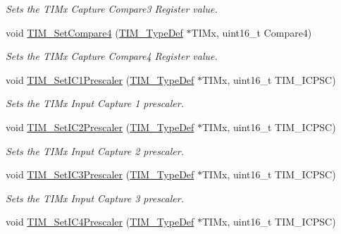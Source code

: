 \begin{DoxyCompactItemize}
\begin{DoxyCompactList}\small\item\em Sets the T\+I\+Mx Capture Compare3 Register value. \end{DoxyCompactList}\item 
void \mbox{\hyperlink{group___t_i_m___private___functions_gaf428edf474804691d6f587e78c97a082}{T\+I\+M\+\_\+\+Set\+Compare4}} (\mbox{\hyperlink{struct_t_i_m___type_def}{T\+I\+M\+\_\+\+Type\+Def}} $\ast$T\+I\+Mx, uint16\+\_\+t Compare4)
\begin{DoxyCompactList}\small\item\em Sets the T\+I\+Mx Capture Compare4 Register value. \end{DoxyCompactList}\item 
void \mbox{\hyperlink{group___t_i_m___private___functions_gaf0f684dea88e222de9689d8ed0ca8805}{T\+I\+M\+\_\+\+Set\+I\+C1\+Prescaler}} (\mbox{\hyperlink{struct_t_i_m___type_def}{T\+I\+M\+\_\+\+Type\+Def}} $\ast$T\+I\+Mx, uint16\+\_\+t T\+I\+M\+\_\+\+I\+C\+P\+SC)
\begin{DoxyCompactList}\small\item\em Sets the T\+I\+Mx Input Capture 1 prescaler. \end{DoxyCompactList}\item 
void \mbox{\hyperlink{group___t_i_m___private___functions_ga3cc4869b5fe73271808512c89322a325}{T\+I\+M\+\_\+\+Set\+I\+C2\+Prescaler}} (\mbox{\hyperlink{struct_t_i_m___type_def}{T\+I\+M\+\_\+\+Type\+Def}} $\ast$T\+I\+Mx, uint16\+\_\+t T\+I\+M\+\_\+\+I\+C\+P\+SC)
\begin{DoxyCompactList}\small\item\em Sets the T\+I\+Mx Input Capture 2 prescaler. \end{DoxyCompactList}\item 
void \mbox{\hyperlink{group___t_i_m___private___functions_ga76f906383b8132ebe00dffadb70cf7f9}{T\+I\+M\+\_\+\+Set\+I\+C3\+Prescaler}} (\mbox{\hyperlink{struct_t_i_m___type_def}{T\+I\+M\+\_\+\+Type\+Def}} $\ast$T\+I\+Mx, uint16\+\_\+t T\+I\+M\+\_\+\+I\+C\+P\+SC)
\begin{DoxyCompactList}\small\item\em Sets the T\+I\+Mx Input Capture 3 prescaler. \end{DoxyCompactList}\item 
void \mbox{\hyperlink{group___t_i_m___private___functions_ga0f2c784271356d6b64b8c0da64dbdbc2}{T\+I\+M\+\_\+\+Set\+I\+C4\+Prescaler}} (\mbox{\hyperlink{struct_t_i_m___type_def}{T\+I\+M\+\_\+\+Type\+Def}} $\ast$T\+I\+Mx, uint16\+\_\+t T\+I\+M\+\_\+\+I\+C\+P\+SC)

\end{DoxyCompactItemize}
